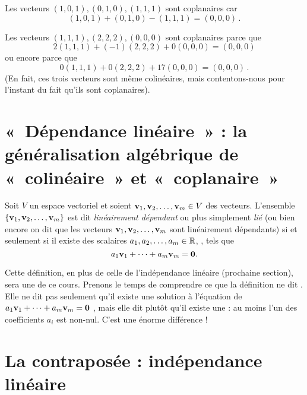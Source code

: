 
\begin{myexample} Les vecteurs $(1,0,1), (0,1,0), (1,1,1)$ sont coplanaires car
$$
(1,0,1) + (0,1,0) - (1,1,1) = (0,0,0)\,.
$$
\end{myexample}

\begin{myexample} Les vecteurs $(1,1,1), (2,2,2), (0,0,0)$ sont coplanaires parce que
$$
2(1,1,1) + (-1)(2,2,2)+0(0,0,0) = (0,0,0)
$$
ou encore parce que
$$
0(1,1,1) + 0(2,2,2) + 17(0,0,0) = (0,0,0)\,.
$$
(En fait, ces trois vecteurs sont même colinéaires, mais contentons-nous pour l'instant du fait qu'ils sont coplanaires).
\end{myexample}

\section[Dépendance linéaire]{«~Dépendance linéaire~» : la généralisation algébrique de «~colinéaire~» et «~coplanaire~»}



\begin{definition}  Soit $V$ un espace vectoriel et soient
$\mathbf{v}_1, \mathbf{v}_2, \ldots, \mathbf{v}_m \in V$ des vecteurs.  L'ensemble 
$\{\mathbf{v}_1, \mathbf{v}_2, \ldots, \mathbf{v}_m\}$ est dit \emph{linéairement dépendant} ou plus simplement \emph{li\'e}
(ou bien encore on dit que les vecteurs $\mathbf{v}_1, \mathbf{v}_2, \ldots, \mathbf{v}_m$ sont linéairement dépendants)
si et seulement si il existe des scalaires $a_1, a_2, \ldots, a_m \in \mathbb{R}$,
, tels que 
$$
a_1\mathbf{v}_1 + \cdots + a_m\mathbf{v}_m = \mathbf{0}.
$$
\end{definition}

Cette définition, en plus de celle de l'indépendance linéaire (prochaine section), sera une  de ce cours.  Prenons le temps de comprendre ce que la définition ne dit . Elle ne dit pas seulement qu'il existe une solution à l'équation de  $a_1\mathbf{v}_1 + \cdots + a_m\mathbf{v}_m = \mathbf{0}$ , mais  elle dit plut\^ot qu'il existe une  : au moins l'un des coefficients $a_i$ est non-nul.  C'est une énorme différence !

\section{La contrapos\'ee : ind\'ependance linéaire}

